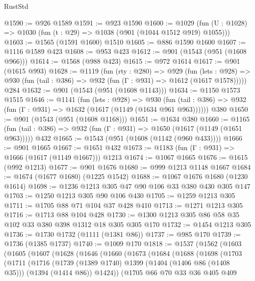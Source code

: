 \begin{lexlean}{RustStd}
\begin{coremodule}
@1590 := @926 @1589
@1591 := @923 @1590
@1600 := @1029 (fun (U : @1028) => @1030 (fun (t : @29) => @1038 (@901 (@1044 @1512 @919) @1055)))
@1603 := @1565 (@1591 @1600) @1510
@1605 := @886 @1590 @1600
@1607 := @1116 @1589 @423
@1608 := @953 @423
@1612 := @901 (@1543 (@951 (@1608 @966)))
@1614 := @1568 (@988 @423)
@1615 := @972 @1614
@1617 := @901 (@1615 @993)
@1628 := @1119
    (fun (rty : @280) =>
    @929
      (fun (lets : @928) =>
      @930 (fun (tail : @386) => @932 (fun (Γ : @931) => @1612 (@1617 @1578)))))
    @284
@1632 := @901 (@1543 (@951 (@1608 @1143)))
@1634 := @1150 @1573 @1515
@1646 := @1141
    (fun (lets : @928) =>
    @930 (fun (tail : @386) => @932 (fun (Γ : @931) => @1632 (@1617 (@1149 (@1634 @961 @963))))))
    @380
@1650 := @901 (@1543 (@951 (@1608 @1168)))
@1651 := @1634 @380
@1660 := @1165
    (fun (tail : @386) => @932 (fun (Γ : @931) => @1650 (@1617 (@1149 (@1651 @963)))))
    @432
@1665 := @1543 (@951 (@1608 (@1142 (@960 @433))))
@1666 := @901 @1665
@1667 := @1651 @432
@1673 := @1183 (fun (Γ : @931) => @1666 (@1617 (@1149 @1667))) @1213
@1674 := @1067 @1665
@1676 := @1615 (@992 @1213)
@1677 := @901 @1676
@1680 := @999 @1213 @1148 @1667
@1684 := @1674 (@1677 @1680) (@1225 @1542)
@1688 := @1067 @1676 @1680 (@1230 @1614)
@1698 := @1236 @1213 @305 @47 @90 @106 @33 @380 @430 @305 @147
@1703 := @1250 @1213 @305 @90 @106 @430
@1705 := @1259 @1213 @305
@1711 := @1705 @88 @71 @104 @37 @428 @410
@1713 := @1271 @1213 @305
@1716 := @1713 @88 @104 @428
@1730 := @1300 @1213 @305 @86 @58 @35 @102 @33 @380 @398 @1312 @18 @305 @305 @170
@1732 := @1454 @1213 @305
@1736 := @1730 @1732 (@1111 (@1381 @86))
@1737 := @985 @170
@1739 := @1736 (@1385 @1737)
@1740 := @1009 @170
@1818 := @1537
    (@1562
      (@1603
        (@1605
          (@1607
            (@1628
              (@1646
                (@1660
                  (@1673
                    (@1684
                      (@1688
                        (@1698
                          (@1703
                            (@1711
                              (@1716
                                (@1739
                                  (@1389 @1740)
                                  @1399
                                  (@1404 (@1406 @86 (@1408 @35)))
                                  (@1394 (@1414 @86))
                                  @1424))
                              (@1705
                                @66
                                @70
                                @33
                                @36
                                @405
                                @409

\end{coremodule}
\end{lexlean}
